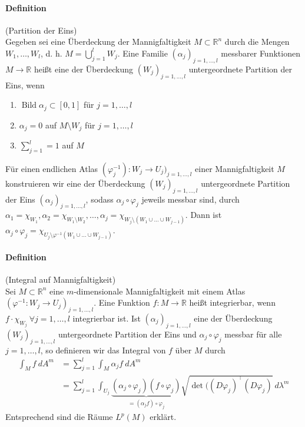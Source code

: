 \documentclass[12pt,a4paper,fleqn]{article}
\def\R{{\mathbb{R}}}
\begin{document}
 \paragraph{Definition} (Partition der Eins)\\
 Gegeben sei eine Überdeckung der Mannigfaltigkeit $M \subset \R^n$ durch die Mengen $W_1, \dots, W_l$, d. h. $M = \bigcup_{j = 1}^l W_j$. Eine Familie $(\alpha_j)_{j = 1, \dots, l}$ messbarer Funktionen $M \rightarrow \R$ heißt eine der Überdeckung $(W_j)_{j = 1, \dots, l}$ untergeordnete Partition der Eins, wenn
 \begin{enumerate}
 \item$\operatorname{Bild}\alpha_j \subset [0, 1]$ für $j = 1, \dots, l$
 \item$\alpha_j = 0$ auf $M\setminus W_j$ für $j = 1, \dots, l$
 \item$\sum_{j = 1}^l = 1$ auf $M$
 \end{enumerate}
 Für einen endlichen Atlas $(\varphi_j^{-1})\colon W_j \rightarrow U_j)_{j = 1, \dots, l}$ einer Mannigfaltigkeit $M$ konstruieren wir eine der Überdeckung $(W_j)_{j = 1, \dots, l}$ untergeordnete Partition der Eins $(\alpha_j)_{j = 1, \dots, l}$, sodass $\alpha_j \circ \varphi_j$ jeweils messbar sind, durch $\alpha_1 = \chi_{W_1}, \alpha_2 = \chi_{W_1\setminus W_2}, \dots, {\alpha_j = \chi_{W_j \setminus (W_1\cup\dots \cup W_{j-1})}}$. Dann ist $\alpha_j \circ \varphi_j = \chi_{U_j\setminus \varphi^{-1}(W_1\cup\dots\cup W_{j-1})}$.
 
 \paragraph{Definition} (Integral auf Mannigfaltigkeit)\\
 Sei $M \subset \R^n$ eine $m$-dimensionale Mannigfaltigkeit mit einem Atlas ${(\varphi^{-1}\colon W_j \rightarrow U_j)_{j = 1, \dots, l}}$. Eine Funktion $f\colon M \rightarrow \R$ heißt integrierbar, wenn $f \cdot \chi_{W_j}\ \forall j = 1, \dots, l$ integrierbar ist. Ist $(\alpha_j)_{j = 1, \dots, l}$ eine der Überdeckung $(W_j)_{j = 1, \dots, l}$ untergeordnete Partition der Eins und $\alpha_j \circ \varphi_j$ messbar für alle $j = 1, \dots, l$, so definieren wir das Integral von $f$ über $M$ durch
 \begin{align*}
 \int_M f\ dA^m &= \sum_{j = 1}^l \int_M \alpha_j f\ dA^m\\
 &= \sum_{j = 1}^l \int_{U_j} \underbrace{(\alpha_j \circ \varphi_j)(f \circ \varphi_j)}_{= (\alpha_j f)\circ \varphi_j}\sqrt{\det((D\varphi_j)^\top(D\varphi_j)}\ d\lambda^m
 \end{align*}
 Entsprechend sind die Räume $L^p(M)$ erklärt.
\end{document}

